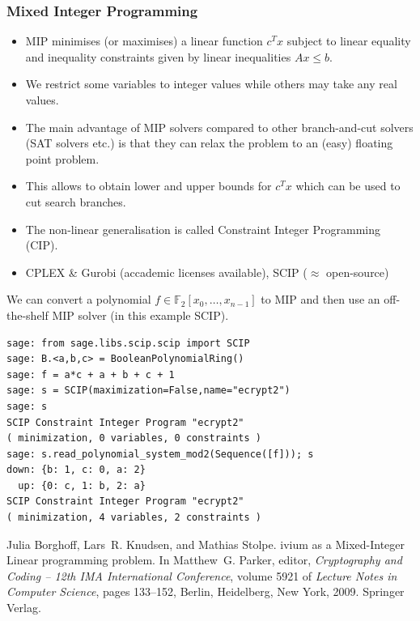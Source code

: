 \documentclass[9pt]{beamer}
\newcommand{\field}[1]{\mathbb{#1}}
\begin{document}
\begin{frame}
\frametitle{Mixed Integer Programming} 

\begin{itemize}
 \item MIP minimises (or maximises) a linear function $c^T x$ subject to linear equality and inequality constraints given by linear inequalities $Ax ≤ b$. 
 \item We restrict some variables to integer values while others may take any real values.
 \item The main advantage of MIP solvers compared to other branch-and-cut solvers (SAT solvers etc.) is that they can relax the problem to an (easy) floating point problem.
 \item This allows to obtain lower and upper bounds for $c^T x$ which can be used to cut search branches.
 \item The non-linear generalisation is called Constraint Integer Programming (CIP).
 \item CPLEX \& Gurobi (accademic licenses available), SCIP ($\approx$ open-source)
\end{itemize}


\framebreak
 
We can convert a polynomial $f \in \field{F}_2[x_0,\dots,x_{n-1}]$ to MIP and then use an off-the-shelf MIP solver (in this example SCIP).

\begin{lstlisting}
sage: from sage.libs.scip.scip import SCIP
sage: B.<a,b,c> = BooleanPolynomialRing()
sage: f = a*c + a + b + c + 1
sage: s = SCIP(maximization=False,name="ecrypt2")
sage: s
SCIP Constraint Integer Program "ecrypt2" 
( minimization, 0 variables, 0 constraints )
sage: s.read_polynomial_system_mod2(Sequence([f])); s
down: {b: 1, c: 0, a: 2}
  up: {0: c, 1: b, 2: a}
SCIP Constraint Integer Program "ecrypt2" 
( minimization, 4 variables, 2 constraints )
\end{lstlisting}

\begin{small}
\begin{thebibliography}{biviummip}
Julia Borghoff, Lars~R. Knudsen, and Mathias Stolpe.
ivium as a {M}ixed-{I}nteger {L}inear programming problem.
\newblock In Matthew~G. Parker, editor, {\em Cryptography and Coding -- 12th
  IMA International Conference}, volume 5921 of {\em Lecture Notes in Computer
  Science}, pages 133--152, Berlin, Heidelberg, New York, 2009. Springer
  Verlag.
\end{thebibliography}
\end{small}
\end{frame}
\end{document}
